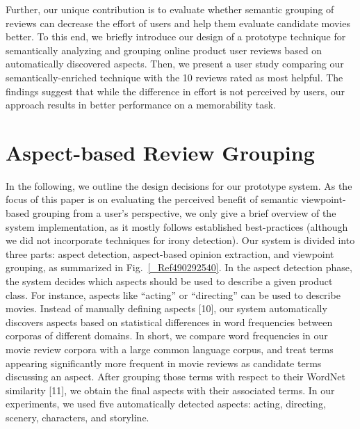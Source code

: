 \documentclass[runningheads,a4paper]{llncs}
\begin{document}
Further, our unique contribution is to evaluate whether semantic grouping of reviews can decrease the effort of users and help them evaluate candidate movies better. To this end, we briefly introduce our design of a prototype technique for semantically analyzing and grouping online product user reviews based on automatically discovered aspects. Then, we present a user study comparing our semantically-enriched technique with the 10 reviews rated as most helpful. The findings suggest that while the difference in effort is not perceived by users, our approach results in better performance on a memorability task.

\section{Aspect-based Review Grouping}

In the following, we outline the design decisions for our prototype system. As the focus of this paper is on evaluating the perceived benefit of semantic viewpoint-based grouping from a user's perspective, we only give a brief overview of the system implementation, as it mostly follows established best-practices (although we did not incorporate techniques for irony detection). Our system is divided into three parts: aspect detection, aspect-based opinion extraction, and viewpoint grouping, as summarized in Fig.~\ref{_Ref490292540}. In the aspect detection phase, the system decides which aspects should be used to describe a given product class. For instance, aspects like ``acting'' or ``directing'' can be used to describe movies. Instead of manually defining aspects [10], our system automatically discovers aspects based on statistical differences in word frequencies between corporas of different domains. In short, we compare word frequencies in our movie review corpora with a large common language corpus, and treat terms appearing significantly more frequent in movie reviews as candidate terms discussing an aspect. After grouping those terms with respect to their WordNet similarity [11], we obtain the final aspects with their associated terms. In our experiments, we used five automatically detected aspects: acting, directing, scenery, characters, and storyline.
\end{document}
